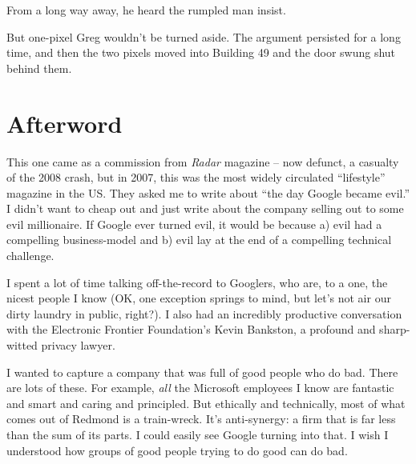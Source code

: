 From a long way away, he heard the rumpled man insist.

But one-pixel Greg wouldn't be turned aside. The argument persisted for 
a long time, and then the two pixels moved into Building 49 and the 
door swung shut behind them.

\section{Afterword}

This one came as a commission from \emph{Radar} magazine -- now 
defunct, a casualty of the 2008 crash, but in 2007, this was the most 
widely circulated “lifestyle” magazine in the US. They asked me to 
write about “the day Google became evil.” I didn't want to cheap 
out and just write about the company selling out to some evil 
millionaire. If Google ever turned evil, it would be because a) evil 
had a compelling business-model and b) evil lay at the end of a 
compelling technical challenge.

I spent a lot of time talking off-the-record to Googlers, who are, to a 
one, the nicest people I know (OK, one exception springs to mind, but 
let's not air our dirty laundry in public, right?). I also had an 
incredibly productive conversation with the Electronic Frontier 
Foundation's Kevin Bankston, a profound and sharp-witted privacy lawyer.

I wanted to capture a company that was full of good people who do bad. 
There are lots of these. For example, \emph{all} the Microsoft 
employees I know are fantastic and smart and caring and principled. But 
ethically and technically, most of what comes out of Redmond is a 
train-wreck. It's anti-synergy: a firm that is far less than the sum of 
its parts. I could easily see Google turning into that. I wish I 
understood how groups of good people trying to do good can do bad.

